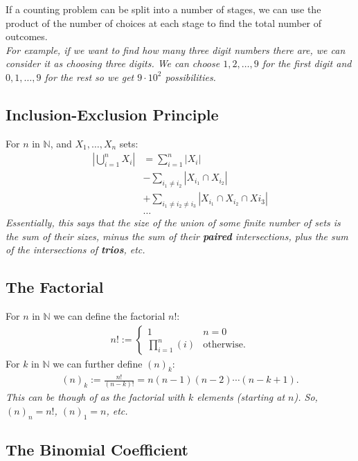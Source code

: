 \documentclass[a4paper, 12pt, twoside]{article}
\begin{document}
If a counting problem can be split into a number of stages, we can
use the product of the number of choices at each stage to find
the total number of outcomes.
\\[\baselineskip]
\textit{For example, if we want to find how many three digit numbers 
there are, we can consider it as choosing three digits. We can choose
$1, 2, \ldots, 9$ for the first digit and $0, 1, \ldots, 9$ for 
the rest so we get $9 \cdot 10^2$ possibilities.}

\subsection{Inclusion-Exclusion Principle}

For $n$ in $\mathbb{N}$, and $X_1, \ldots, X_n$ sets: \begin{align*}
  \left|\bigcup_{i = 1}^n X_i\right| &= \sum_{i = 1}^n |X_i| \\
  &-\sum_{i_1 \neq i_2} |X_{i_1} \cap X_{i_2}| \\
  &+\sum_{i_1 \neq i_2 \neq i_3} |X_{i_1} \cap X_{i_2} \cap X{i_3}| \\
  &\ldots
\end{align*} \textit{Essentially, this says that the size of the
union of some finite number of sets is the sum of their sizes,
minus the sum of their \textbf{paired} intersections,
plus the sum of the intersections of \textbf{trios}, etc.}

\subsection{The Factorial}

For $n$ in $\mathbb{N}$ we can define the factorial $n!$: \begin{align*}
  n! := \begin{cases*}
    1 & n = 0 \\
    \prod_{i = 1}^n(i) & \text{otherwise.}
  \end{cases*}
\end{align*} For $k$ in $\mathbb{N}$ we can further define $(n)_k$: \begin{gather*}
  (n)_k := \frac{n!}{(n-k)!} = n(n-1)(n-2)\cdots(n-k+1).
\end{gather*} \textit{This can be though of as the factorial with $k$
elements (starting at $n$). So, $(n)_n = n!$, $(n)_1 = n$, etc.}

\newpage

\subsection{The Binomial Coefficient}
\end{document}
